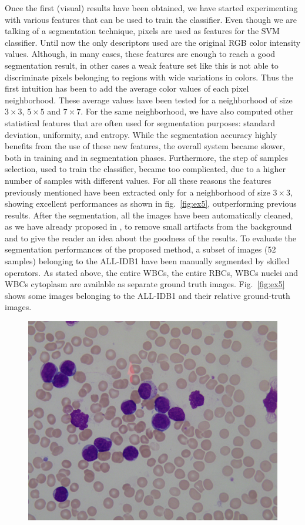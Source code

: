 {	%
	Once the first (visual) results have been obtained, we have started experimenting with various features that can be used to train the classifier.
	Even though we are talking of a segmentation technique, pixels are used as features for the SVM classifier. Until now the only descriptors used are the original RGB color intensity values. Although, in many cases, these features are enough to reach a good segmentation result, in other cases a weak feature set like this is not able to discriminate pixels belonging to regions with wide variations in colors. Thus the first intuition has been to add the average color values of each pixel neighborhood. These average values have been tested for a neighborhood of size $3 \times 3$, $5 \times 5$ and $7 \times 7$. For the same neighborhood, we have also computed other statistical features that are often used for segmentation purposes: standard deviation, uniformity, and entropy. While the segmentation accuracy highly benefits from the use of these new features, the overall system became slower, both in training and in segmentation phases.
	Furthermore, the step of samples selection, used to train the classifier, became too complicated, due to a higher number of samples with different values. For all these reasons the features previously mentioned have been extracted only for a neighborhood of size $3 \times 3$, showing excellent performances as shown in fig.~\ref{fig:ex5}, outperforming previous results. After the segmentation, all the images have been automatically cleaned, as we have already proposed in \cite{Put13c}, to remove small artifacts from the background and to give the reader an idea about the goodness of the results.
	To evaluate the segmentation performances of the proposed method, a subset of images (52 samples) belonging to the ALL-IDB1 have been manually segmented by skilled operators. As stated above, the entire WBCs, the entire RBCs, WBCs nuclei and WBCs cytoplasm are available as separate ground truth images. Fig.~\ref{fig:ex5} shows some images belonging to the ALL-IDB1 and their relative ground-truth images.
	\begin{figure}[!b]
		\centering
		\includegraphics[height=0.18\textwidth]{images/2015_1_caip/Im003_1}

\end{figure}}
